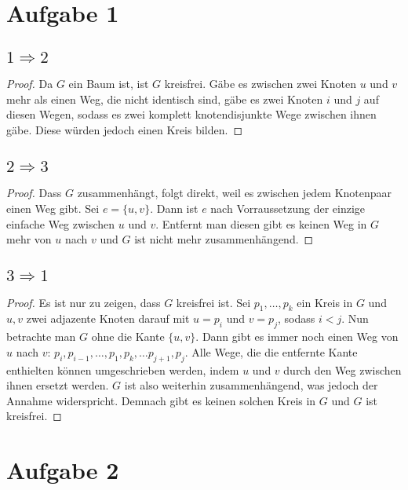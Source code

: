\documentclass[10pt,a4paper]{article}
\begin{document}
\section{Aufgabe 1}

\subsection{$1 \Rightarrow 2$}
\begin{proof}
  Da $G$ ein Baum ist, ist $G$ kreisfrei.
  Gäbe es zwischen zwei Knoten $u$ und $v$ mehr als einen Weg, die nicht identisch sind, gäbe es zwei Knoten $i$ und $j$ auf diesen Wegen, sodass es zwei komplett knotendisjunkte Wege zwischen ihnen gäbe.
  Diese würden jedoch einen Kreis bilden.
\end{proof}

\subsection{$2 \Rightarrow 3$}
\begin{proof}
  Dass $G$ zusammenhängt, folgt direkt, weil es zwischen jedem Knotenpaar einen Weg gibt.
  Sei $e = \{u, v\}$.
  Dann ist $e$ nach Vorraussetzung der einzige einfache Weg zwischen $u$ und $v$.
  Entfernt man diesen gibt es keinen Weg in $G$ mehr von $u$ nach $v$ und $G$ ist nicht mehr zusammenhängend.
\end{proof}

\subsection{$3 \Rightarrow 1$}
\begin{proof}
  Es ist nur zu zeigen, dass $G$ kreisfrei ist.
  Sei $p_{1}, \dots, p_{k}$ ein Kreis in $G$ und $u, v$ zwei adjazente Knoten darauf mit $u = p_{i}$ und $v = p_{j}$, sodass $i < j$.
  Nun betrachte man $G$ ohne die Kante $\{u, v\}$.
  Dann gibt es immer noch einen Weg von $u$ nach $v$: $p_{i}, p_{i - 1}, \dots, p_{1}, p_{k}, \dots p_{j + 1}, p_{j}$.
  Alle Wege, die die entfernte Kante enthielten können umgeschrieben werden, indem $u$ und $v$ durch den Weg zwischen ihnen ersetzt werden.
  $G$ ist also weiterhin zusammenhängend, was jedoch der Annahme widerspricht.
  Demnach gibt es keinen solchen Kreis in $G$ und $G$ ist kreisfrei.
\end{proof}

\section{Aufgabe 2}
\end{document}
